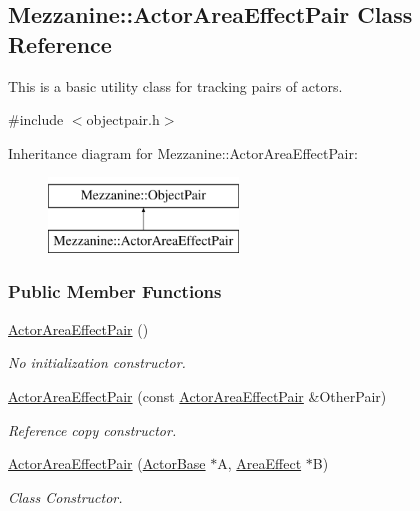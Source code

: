 \hypertarget{classMezzanine_1_1ActorAreaEffectPair}{
\subsection{Mezzanine::ActorAreaEffectPair Class Reference}
\label{classMezzanine_1_1ActorAreaEffectPair}
}


This is a basic utility class for tracking pairs of actors.  




{\ttfamily \#include $<$objectpair.h$>$}

Inheritance diagram for Mezzanine::ActorAreaEffectPair:\begin{figure}[H]
\begin{center}
\leavevmode
\includegraphics[height=2.000000cm]{classMezzanine_1_1ActorAreaEffectPair}
\end{center}
\end{figure}
\subsubsection*{Public Member Functions}
\begin{DoxyCompactItemize}
\item 
\hypertarget{classMezzanine_1_1ActorAreaEffectPair_a0d83bf5bdfd0b132683fc50bc526498a}{
\hyperlink{classMezzanine_1_1ActorAreaEffectPair_a0d83bf5bdfd0b132683fc50bc526498a}{ActorAreaEffectPair} ()}
\label{classMezzanine_1_1ActorAreaEffectPair_a0d83bf5bdfd0b132683fc50bc526498a}

\begin{DoxyCompactList}\small\item\em No initialization constructor. \item\end{DoxyCompactList}\item 
\hyperlink{classMezzanine_1_1ActorAreaEffectPair_a0f434bb23e8b1ce5ae686e7698e0737b}{ActorAreaEffectPair} (const \hyperlink{classMezzanine_1_1ActorAreaEffectPair}{ActorAreaEffectPair} \&OtherPair)
\begin{DoxyCompactList}\small\item\em Reference copy constructor. \item\end{DoxyCompactList}\item 
\hyperlink{classMezzanine_1_1ActorAreaEffectPair_aa02a8e44171a7199ae45c187822c211c}{ActorAreaEffectPair} (\hyperlink{classMezzanine_1_1ActorBase}{ActorBase} $\ast$A, \hyperlink{classMezzanine_1_1AreaEffect}{AreaEffect} $\ast$B)
\begin{DoxyCompactList}\small\item\em Class Constructor. \item\end{DoxyCompactList}\end{DoxyCompactItemize}
